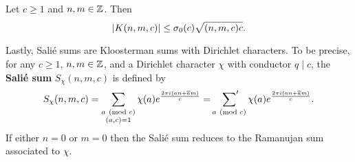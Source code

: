       \begin{theorem*}
        Let $c \ge 1$ and $n,m \in \mathbb{Z}$. Then
        \[
          |K(n,m,c)| \le \sigma_{0}(c)\sqrt{(n,m,c)c}.
        \]
      \end{theorem*}

      Lastly, Sali\'e sums are Kloosterman sums with Dirichlet characters. To be precise, for any $c \ge 1$, $n,m \in \mathbb{Z}$, and a Dirichlet character $\chi$ with conductor $q \mid c$, the \textbf{Sali\'e sum} $S_{\chi}(n,m,c)$ is defined by
      \[
        S_{\chi}(n,m,c) = \sum_{\substack{a \ \left(\text{mod }c\right) \\ (a,c) = 1}}\chi(a)e^{\frac{2\pi i(an+\overline{a}m)}{c}} = \sideset{}{'}\sum_{a \ \left(\text{mod }c\right)}\chi(a)e^{\frac{2\pi i(an+\overline{a}m)}{c}}.
      \]
      If either $n = 0$ or $m = 0$ then the Sali\'e sum reduces to the Ramanujan sum associated to $\chi$.
